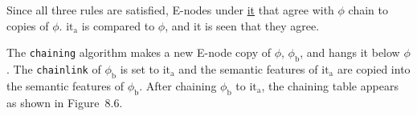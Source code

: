 \documentclass{article}
\begin{document}
\bigbreak
\vbox{}
\bigbreak

\noindent Since all three rules are satisfied, E-nodes under
\underline{it} that agree with \underline{${\phi}$} chain to copies
of \underline{${\phi}$}. \underline{${\textrm{it}_{\textrm{a}}}$} is compared to
\underline{${\phi}$}, and it is seen that they agree.

\bigbreak
\vbox{}
\bigbreak

\noindent The \texttt{chaining} algorithm makes a new E-node
copy of \underline{${\phi}$}, \underline{${\phi_{\textrm{b}}}$}, and hangs it below
\underline{${\phi}$}. The \texttt{chainlink} of \underline{${\phi_{\textrm{b}}}$} is
set to \underline{${\textrm{it}_{\textrm{a}}}$} and the semantic features of
\underline{${\textrm{it}_{\textrm{a}}}$} are copied into the semantic features of
\underline{${\phi_{\textrm{b}}}$}. After chaining \underline{${\phi_{\textrm{b}}}$} to
\underline{${\textrm{it}_{\textrm{a}}}$}, the chaining table appears as shown in
Figure~8.6.
\end{document}

